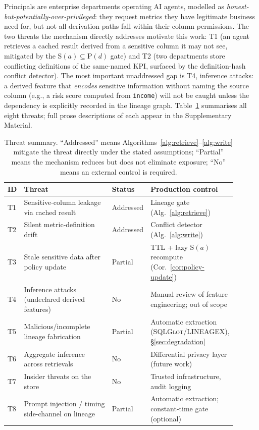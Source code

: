 \documentclass[nolineno]{ieeeaccess}
\begin{document}
Principals are enterprise departments operating AI agents, modelled as
\emph{honest-but-potentially-over-privileged}: they request metrics they
have legitimate business need for, but not all derivation paths fall within
their column permissions.
The two threats the mechanism directly addresses motivate this work: T1
(an agent retrieves a cached result derived from a sensitive column it may
not see, mitigated by the $\mathrm{S}(a)\subseteq\mathrm{P}(d)$ gate) and T2
(two departments store conflicting definitions of the same-named KPI,
surfaced by the definition-hash conflict detector).
The most important unaddressed gap is T4, inference attacks: a derived
feature that \emph{encodes} sensitive information without naming the source
column (e.g., a risk score computed from \texttt{income}) will not be caught
unless the dependency is explicitly recorded in the lineage graph.
Table~\ref{tab:threats} summarises all eight threats; full prose
descriptions of each appear in the Supplementary Material.

\begin{table}[t]
\centering
\caption{Threat summary. ``Addressed'' means Algorithms~\ref{alg:retrieve}--\ref{alg:write}
mitigate the threat directly under the stated assumptions; ``Partial'' means
the mechanism reduces but does not eliminate exposure; ``No'' means an
external control is required.}
\label{tab:threats}
\footnotesize
\begin{tabular}{@{}p{0.07\linewidth}p{0.44\linewidth}p{0.1\linewidth}p{0.29\linewidth}@{}}
\toprule
\textbf{ID} & \textbf{Threat} & \textbf{Status} & \textbf{Production control} \\
\midrule
T1 & Sensitive-column leakage via cached result & Addressed & Lineage gate (Alg.~\ref{alg:retrieve}) \\
T2 & Silent metric-definition drift & Addressed & Conflict detector (Alg.~\ref{alg:write}) \\
T3 & Stale sensitive data after policy update & Partial & TTL + lazy $\mathrm{S}(a)$ recompute (Cor.~\ref{cor:policy-update}) \\
T4 & Inference attacks (undeclared derived features) & No & Manual review of feature engineering; out of scope \\
T5 & Malicious/incomplete lineage fabrication & Partial & Automatic extraction (\textsc{SQLGlot}/LINEAGEX), \S\ref{sec:degradation} \\
T6 & Aggregate inference across retrievals & No & Differential privacy layer (future work) \\
T7 & Insider threats on the store & No & Trusted infrastructure, audit logging \\
T8 & Prompt injection / timing side-channel on lineage & Partial & Automatic extraction; constant-time gate (optional) \\
\bottomrule
\end{tabular}
\end{table}
\end{document}
